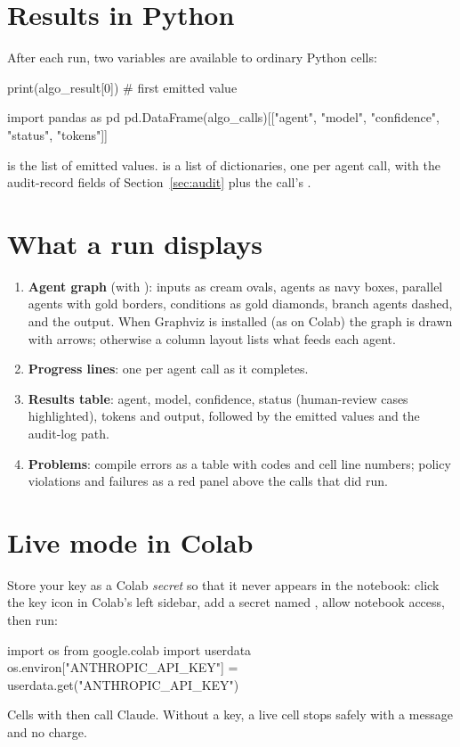\section{Results in Python}

After each run, two variables are available to ordinary Python cells:

\begin{pycode}[title=a Python cell]
print(algo_result[0])                 # first emitted value

import pandas as pd
pd.DataFrame(algo_calls)[["agent", "model", "confidence", "status", "tokens"]]
\end{pycode}

 is the list of emitted values.  is a list of dictionaries, one per agent call, with the audit-record fields of Section~\ref{sec:audit} plus the call's .

\section{What a run displays}

\begin{enumerate}
  \item \textbf{Agent graph} (with ): inputs as cream ovals, agents as navy boxes, parallel agents with gold borders, conditions as gold diamonds, branch agents dashed, and the output. When Graphviz is installed (as on Colab) the graph is drawn with arrows; otherwise a column layout lists what feeds each agent.
  \item \textbf{Progress lines}: one per agent call as it completes.
  \item \textbf{Results table}: agent, model, confidence, status (human-review cases highlighted), tokens and output, followed by the emitted values and the audit-log path.
  \item \textbf{Problems}: compile errors as a table with codes and cell line numbers; policy violations and failures as a red panel above the calls that did run.
\end{enumerate}

\section{Live mode in Colab}

Store your key as a Colab \emph{secret} so that it never appears in the notebook: click the key icon in Colab's left sidebar, add a secret named , allow notebook access, then run:

\begin{pycode}
import os
from google.colab import userdata
os.environ["ANTHROPIC_API_KEY"] = userdata.get("ANTHROPIC_API_KEY")
\end{pycode}

Cells with  then call Claude. Without a key, a live cell stops safely with a message and no charge.
